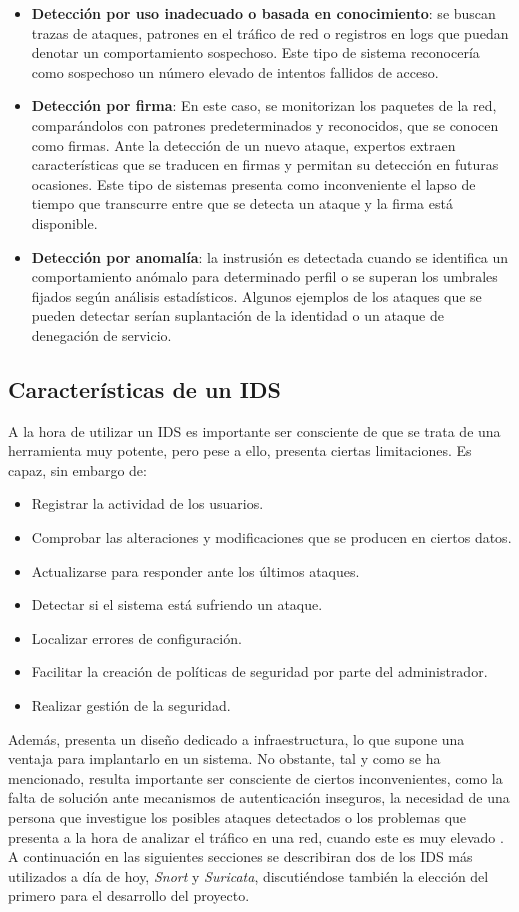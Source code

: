 \begin{itemize}
	\item \textbf{Detección por uso inadecuado o basada en conocimiento}: se buscan trazas de ataques, patrones en el tráfico de red o registros en logs que puedan denotar un comportamiento sospechoso. Este tipo de sistema reconocería como sospechoso un número elevado de intentos fallidos de acceso.
	\item \textbf{Detección por firma}: En este caso, se monitorizan los paquetes de la red, comparándolos con patrones predeterminados y reconocidos, que se conocen como firmas. Ante la detección de un nuevo ataque, expertos extraen características que se traducen en firmas y permitan su detección en futuras ocasiones. Este tipo de sistemas presenta como inconveniente el lapso de tiempo que transcurre entre que se detecta un ataque y la firma está disponible.
	\item \textbf{Detección por anomalía}: la instrusión es detectada cuando se identifica un comportamiento anómalo para determinado perfil o se superan los umbrales fijados según análisis estadísticos. Algunos ejemplos de los ataques que se pueden detectar serían suplantación de la identidad o un ataque de denegación de servicio. 
\end{itemize}
\cite{Vuppala}

\subsection{Características de un IDS}
A la hora de utilizar un IDS es importante ser consciente de que se trata de una herramienta muy potente, pero pese a ello, presenta ciertas limitaciones. Es capaz, sin embargo de: 
\begin{itemize}
	\item Registrar la actividad de los usuarios.
	\item Comprobar las alteraciones y modificaciones que se producen en ciertos datos.
	\item Actualizarse para responder ante los últimos ataques.
	\item Detectar si el sistema está sufriendo un ataque.
	\item Localizar errores de configuración.
	\item Facilitar la creación de políticas de seguridad por parte del administrador.
	\item Realizar gestión de la seguridad.
\end{itemize}
Además, presenta un diseño dedicado a infraestructura, lo que supone una ventaja para implantarlo en un sistema.
No obstante, tal y como se ha mencionado, resulta importante ser consciente de ciertos inconvenientes, como la falta de solución ante mecanismos de autenticación inseguros, la necesidad de una persona que investigue los posibles ataques detectados o los problemas que presenta a la hora de analizar el tráfico en una red, cuando este es muy elevado \cite{Vuppala}.\\
A continuación en las siguientes secciones se describiran dos de los IDS más utilizados a día de hoy, \textit{Snort} y \textit{Suricata}, discutiéndose también la elección del primero para el desarrollo del proyecto.


